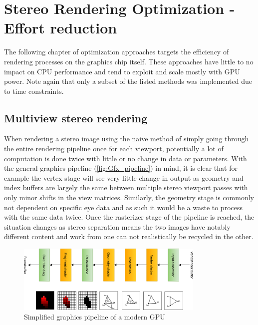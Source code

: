 
\chapter{Stereo Rendering Optimization - Effort reduction}
The following chapter of optimization approaches targets the efficiency of rendering processes on the graphics chip itself. These approaches have little to no impact on CPU performance and tend to exploit and scale mostly with GPU power. 
Note again that only a subset of the listed methods was implemented due to time constraints. 

\section{Multiview stereo rendering} \label{MV_Stereo}
When rendering a stereo image using the naive method of simply going through the entire rendering pipeline once for each viewport, potentially a lot of computation is done twice with little or no change in data or parameters. 
With the general graphics pipeline (\autoref{fig:Gfx_pipeline}) in mind, it is clear that for example the vertex stage will see very little change in output as geometry and index buffers are largely the same between multiple stereo viewport passes with only minor shifts in the view matrices. Similarly, the geometry stage is commonly not dependent on specific eye data and as such it would be a waste to process with the same data twice. Once the rasterizer stage of the pipeline is reached, the situation changes as stereo separation means the two images have notably different content and work from one can not realistically be recycled in the other. 

\begin{figure}[htb]
  \centering
  \includegraphics[width=0.8\textwidth]{pictures/vulkan_simplified_pipeline_L}
  \caption{Simplified graphics pipeline of a modern GPU\cite{Overvoorde.}} \label{fig:Gfx_pipeline}
\end{figure}

